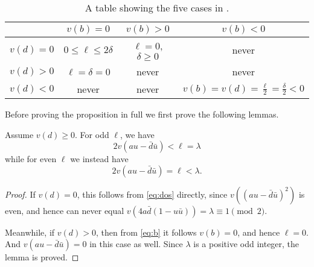 \begin{table}[ht]
  \centering
  \begin{tabular}{cccc}
    \toprule
    & $v(b) = 0$ & $v(b) > 0$ & $v(b) < 0$ \\
    \midrule
    $v(d) = 0$ & $0 \le \ell \le 2 \delta$ & $\ell = 0$, $\delta \ge 0$ & never \\
    $v(d) > 0$ & $\ell = \delta = 0$ & never & never \\
    $v(d) < 0$ & never & never & $v(b) = v(d) = \frac{\ell}{2} = \frac{\delta}{2} < 0$ \\
    \bottomrule
  \end{tabular}
  \caption{A table showing the five cases in .}
  \label{tab:parameter_constraints}
\end{table}


Before proving the proposition in full we first prove the following lemmas.
\begin{lemma}
  \label{lem:au_minus_du}
  Assume $v(d) \ge 0$.
  For odd $\ell$, we have
  \[ 2 v(au - \bar d \bar u) < \ell = \lambda \]
  while for even $\ell$ we instead have
  \[ 2 v(au - \bar d \bar u) = \ell < \lambda. \]
\end{lemma}
\begin{proof}
  If $v(d) = 0$, this follows from \eqref{eq:dos} directly,
  since $v\left( (au - \bar d \bar u)^2 \right)$ is even, and hence
  can never equal $v(4a \bar d (1- u \bar u)) = \lambda \equiv 1 \pmod 2$.

  Meanwhile, if $v(d) > 0$, then from \eqref{eq:b}
  it follows $v(b) = 0$, and hence $\ell = 0$.
  And $v(au - \bar d \bar u) = 0$ in this case as well.
  Since $\lambda$ is a positive odd integer, the lemma is proved.
\end{proof}

